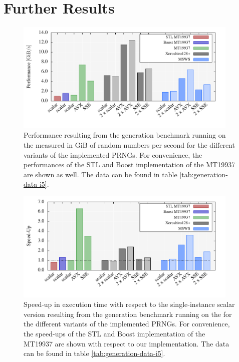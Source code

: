 \documentclass{stdlocal}
\begin{document}
\section{Further Results} %
\label{sec:further_results}
  \begin{figure}[H]
    \center
    \includegraphics[width=0.95\textwidth]{plots/generation_laptop.pdf}
    \caption[Generation Benchmark Performance for ]{%
      Performance resulting from the generation benchmark running on the  measured in $\mathrm{GiB}$ of random numbers per second for the different variants of the implemented PRNGs.
      For convenience, the performances of the STL and Boost implementation of the MT19937 are shown as well.
      The data can be found in table \ref{tab:generation-data-i5}.
    }
    \label{fig:generation-performance-i5}
  \end{figure}

  \begin{figure}[H]
    \center
    \includegraphics[width=0.95\textwidth]{plots/generation_laptop_speedup.pdf}
    \caption[Generation Benchmark Speed-Up for ]{%
      Speed-up in execution time with respect to the single-instance scalar version resulting from the generation benchmark running on the  for the different variants of the implemented PRNGs.
      For convenience, the speed-ups of the STL and Boost implementation of the MT19937 are shown with respect to our implementation.
      The data can be found in table \ref{tab:generation-data-i5}.
    }
    \label{fig:generation-speedup-i5}
  \end{figure}
\end{document}
